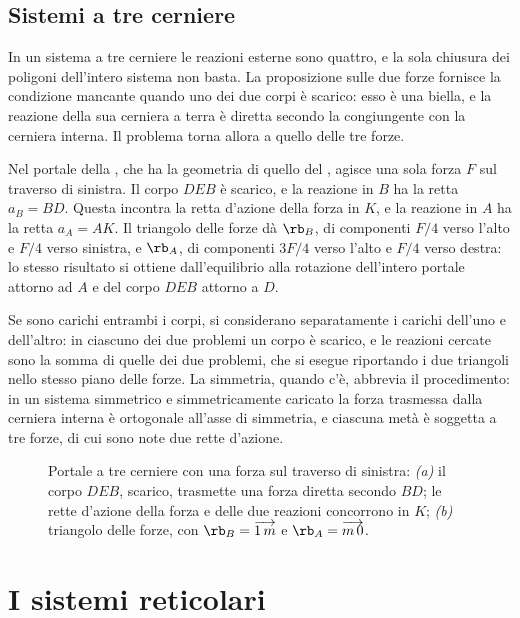 \subsection{Sistemi a tre cerniere}
\label{sec:tre_cerniere_sgr}

In un sistema a tre cerniere le reazioni esterne sono quattro, e la sola chiusura dei poligoni
dell'intero sistema non basta. La proposizione sulle due forze fornisce la condizione mancante
quando uno dei due corpi è scarico: esso è una biella, e la reazione della sua cerniera a terra è
diretta secondo la congiungente con la cerniera interna. Il problema torna allora a quello delle
tre forze.

Nel portale della , che ha la geometria di quello del
, agisce una sola forza $F$ sul traverso di sinistra. Il corpo
$DEB$ è scarico, e la reazione in $B$ ha la retta $a_B = BD$. Questa incontra la retta d'azione
della forza in $K$, e la reazione in $A$ ha la retta $a_A = AK$. Il triangolo delle forze dà
$\rb_B$, di componenti $F/4$ verso l'alto e $F/4$ verso sinistra, e $\rb_A$, di componenti
$3F/4$ verso l'alto e $F/4$ verso destra: lo stesso risultato si ottiene dall'equilibrio alla
rotazione dell'intero portale attorno ad $A$ e del corpo $DEB$ attorno a $D$.

Se sono carichi entrambi i corpi, si considerano separatamente i carichi dell'uno e dell'altro:
in ciascuno dei due problemi un corpo è scarico, e le reazioni cercate sono la somma di quelle
dei due problemi, che si esegue riportando i due triangoli nello stesso piano delle forze. La
simmetria, quando c'è, abbrevia il procedimento: in un sistema simmetrico e simmetricamente
caricato la forza trasmessa dalla cerniera interna è ortogonale all'asse di simmetria, e ciascuna
metà è soggetta a tre forze, di cui sono note due rette d'azione.

\begin{figure}[htbp]
	\centering
	\caption{Portale a tre cerniere con una forza sul traverso di sinistra: \emph{(a)} il corpo
		$DEB$, scarico, trasmette una forza diretta secondo $BD$; le rette d'azione della forza e
		delle due reazioni concorrono in $K$; \emph{(b)} triangolo delle forze, con
		$\rb_B = \protect\overrightarrow{1\,m}$ e $\rb_A = \protect\overrightarrow{m\,0}$.}
	\label{fig:tre_cerniere_sgr}
\end{figure}

\section{I sistemi reticolari}
\label{sec:reticolari_sgr}

